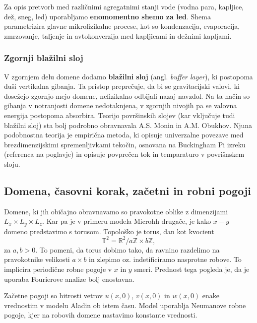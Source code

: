\documentclass[mat2, tisk]{fmfdelo}
\newcommand{\Z}{\mathbb Z}
\begin{document}
Za opis pretvorb med različnimi agregatnimi stanji vode 
(vodna para, kapljice, dež, sneg, led) uporabljamo 
\textbf{enomomentno shemo za led}. Shema parametrizira glavne 
mikrofizikalne procese, kot so kondenzacija, evaporacija, zmrzovanje, 
taljenje in avtokonverzija med kapljicami in dežnimi kapljami.

\subsubsection{Zgornji blažilni sloj}

V zgornjem delu domene dodamo \textbf{blažilni sloj} (angl. \emph{buffer layer}),
ki postopoma duši vertikalna gibanja. Ta pristop preprečuje, da bi se 
gravitacijski valovi, ki dosežejo zgornjo mejo domene, nefizikalno 
odbijali nazaj navzdol. Na ta način so gibanja v notranjosti domene 
nedotaknjena, v zgornjih nivojih pa se valovna energija postopoma 
absorbira. Teorijo površinskih slojev (kar vključuje tudi blažilni sloj) sta 
bolj podrobno obravnavala A.S. Monin in A.M. Obukhov. Njuna podobnostna teorija
je empirična metoda, ki opisuje univerzalne povezave med 
brezdimenzijskimi spremenljivkami tekočin, osnovana na 
Buckingham Pi izreku (referenca na poglavje) in opisuje 
povprečen tok in temparaturo v povrišnskem sloju.

\subsection{Domena, časovni korak, začetni in robni pogoji}

Domene, ki jih običajno obravnavamo so pravokotne oblike z dimenzijami
$L_x \times L_y \times L_z$. Kar pa je v primeru modela Microhh drugače, je kako
$x-y$ domeno predstavimo s torusom. Topološko je torus, dan 
kot kvocient 
$$\mathbb{T}^2 = \mathbb{R}^2 / {a\Z \times b\Z},$$ 
za $a, b > 0$. To pomeni, da torus dobimo tako, da ravnino razdelimo 
na pravokotnike velikosti $a \times b$ in zlepimo oz. indetificiramo
nasprotne robove. To implicira periodične robne pogoje v $x$ in $y$ smeri.
Prednost tega pogleda je, da je uporaba Fourierove analize bolj enostavna.

Začetne pogoji so hitrosti vetrov $u(x, 0)$, $v(x, 0)$ in $w(x, 0)$ enake 
vrednostim v modelu Aladin ob istem času. 
Model uporablja Neumanove robne pogoje, kjer na robovih domene nastavimo 
konstante vrednosti.
\end{document}
